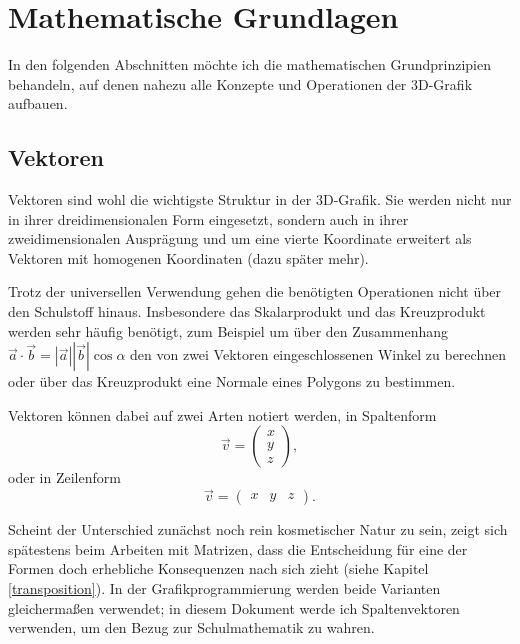 \chapter{Mathematische Grundlagen}
In den folgenden Abschnitten möchte ich die mathematischen Grundprinzipien behandeln, auf denen nahezu alle Konzepte und Operationen der 3D-Grafik aufbauen.

\section{Vektoren}
Vektoren sind wohl die wichtigste Struktur in der 3D-Grafik. Sie werden nicht nur in ihrer dreidimensionalen Form eingesetzt, sondern auch in ihrer zweidimensionalen Ausprägung und um eine vierte Koordinate erweitert als Vektoren mit homogenen Koordinaten (dazu später mehr).

Trotz der universellen Verwendung gehen die benötigten Operationen nicht über den Schulstoff hinaus. Insbesondere das Skalarprodukt und das Kreuzprodukt werden sehr häufig benötigt, zum Beispiel um über den Zusammenhang
$\vec{a}\cdot\vec{b} = \left|\vec{a}\right|\left|\vec{b}\right|\cos\alpha$
den von zwei Vektoren eingeschlossenen Winkel zu berechnen oder über das Kreuzprodukt eine Normale eines Polygons zu bestimmen.

Vektoren können dabei auf zwei Arten notiert werden, in Spaltenform
\begin{equation*}
 \vec{v} = \begin{pmatrix} x \\ y \\ z \end{pmatrix},
\end{equation*}
oder in Zeilenform
\begin{equation*}
 \vec{v} = \begin{pmatrix} x & y & z \end{pmatrix}.
\end{equation*}

Scheint der Unterschied zunächst noch rein kosmetischer Natur zu sein, zeigt sich spätestens beim Arbeiten mit Matrizen, dass die Entscheidung für eine der Formen doch erhebliche Konsequenzen nach sich zieht (siehe Kapitel \ref{transposition}). In der Grafikprogrammierung werden beide Varianten gleichermaßen verwendet; in diesem Dokument werde ich Spaltenvektoren verwenden, um den Bezug zur Schulmathematik zu wahren.

